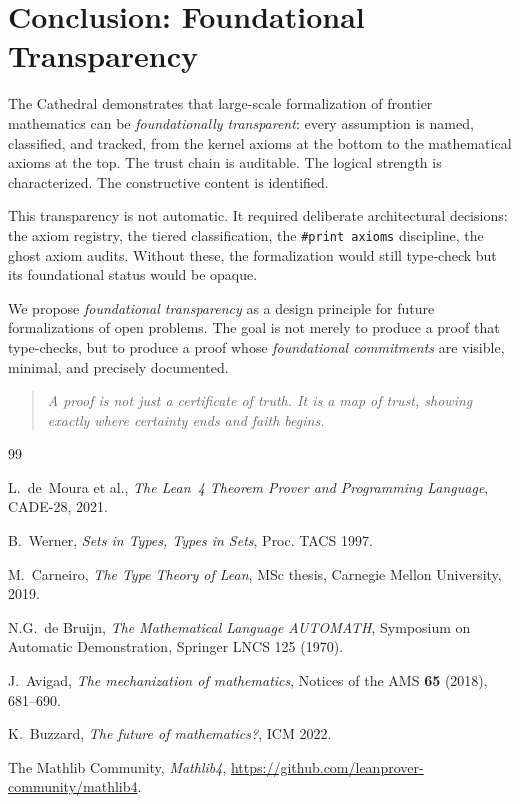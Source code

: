 \documentclass[11pt,a4paper]{article}
\theoremstyle{plain}
\theoremstyle{definition}
\newcommand{\lean}[1]{\texttt{#1}}
\begin{document}
\section{Conclusion: Foundational Transparency}

The Cathedral demonstrates that large-scale formalization of frontier
mathematics can be \emph{foundationally transparent}: every assumption
is named, classified, and tracked, from the kernel axioms at the
bottom to the mathematical axioms at the top. The trust chain is
auditable. The logical strength is characterized. The constructive
content is identified.

This transparency is not automatic. It required deliberate
architectural decisions: the axiom registry, the tiered classification,
the \lean{\#print axioms} discipline, the ghost axiom audits. Without
these, the formalization would still type-check but its foundational
status would be opaque.

We propose \emph{foundational transparency} as a design principle
for future formalizations of open problems. The goal is not merely
to produce a proof that type-checks, but to produce a proof whose
\emph{foundational commitments} are visible, minimal, and precisely
documented.

\begin{quote}
\emph{A proof is not just a certificate of truth. It is a map of
trust, showing exactly where certainty ends and faith begins.}
\end{quote}

\vspace{1cm}

\begin{thebibliography}{99}

L.~de~Moura et al., \emph{The Lean~4 Theorem Prover and Programming
Language}, CADE-28, 2021.

B.~Werner, \emph{Sets in Types, Types in Sets}, Proc. TACS 1997.

M.~Carneiro, \emph{The Type Theory of Lean}, MSc thesis,
Carnegie Mellon University, 2019.

N.G.~de Bruijn, \emph{The Mathematical Language AUTOMATH},
Symposium on Automatic Demonstration, Springer LNCS 125 (1970).

J.~Avigad, \emph{The mechanization of mathematics}, Notices of the
AMS \textbf{65} (2018), 681--690.

K.~Buzzard, \emph{The future of mathematics?}, ICM 2022.

The Mathlib Community, \emph{Mathlib4},
\url{https://github.com/leanprover-community/mathlib4}.

\end{thebibliography}
\end{document}
